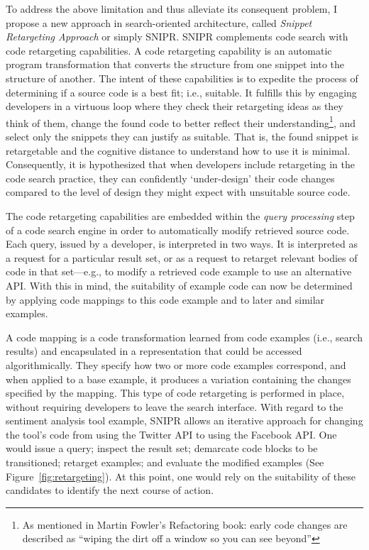 To address the above limitation and thus alleviate its consequent problem, I propose a new approach in search-oriented architecture, called \emph{Snippet Retargeting Approach} or simply \uppercase{SnipR}. \uppercase{SnipR} complements code search with code retargeting capabilities. A code retargeting capability is an automatic program transformation that converts the structure from one snippet into the structure of another. The intent of these capabilities is to expedite the process of determining if a source code is a best fit; i.e., suitable. It fulfills this by engaging developers in a virtuous loop where they check their retargeting ideas as they think of them, change the found code to better reflect their understanding\footnote{As mentioned in Martin Fowler's Refactoring book\cite{Fowler:1999vp}: early code changes are described as ``wiping the dirt off a window so you can see beyond''}, and select only the snippets they can justify as suitable. That is, the found snippet is retargetable and the cognitive distance\cite{Krueger:1992wf} to understand how to use it is minimal. Consequently, it is hypothesized that when developers include retargeting in the code search practice, they can confidently `under-design' their code changes compared to the level of design they might expect with unsuitable source code. 

The code retargeting capabilities are embedded within the \emph{query processing} step of a code search engine in order to automatically modify retrieved source code. Each query, issued by a developer, is interpreted in two ways. It is interpreted as a request for a particular result set, or as a request to retarget relevant bodies of code in that set---e.g., to modify a retrieved code example to use an alternative API. With this in mind, the suitability of example code can now be determined by applying code mappings to this code example and to later and similar examples. 

A code mapping is a code transformation learned from code examples (i.e., search results) and encapsulated in a representation that could be accessed algorithmically. They specify how two or more code examples correspond, and when applied to a base example, it produces a variation containing the changes specified by the mapping. This type of code retargeting is performed in place, without requiring developers to leave the search interface. With regard to the sentiment analysis tool example, \uppercase{SnipR} allows an iterative approach for changing the tool's code from using the Twitter API to using the Facebook API. One would issue a query; inspect the result set; demarcate code blocks to be transitioned; retarget examples; and evaluate the modified examples (See Figure~\ref{fig:retargeting}). At this point, one would rely on the suitability of these candidates to identify the next course of action.

